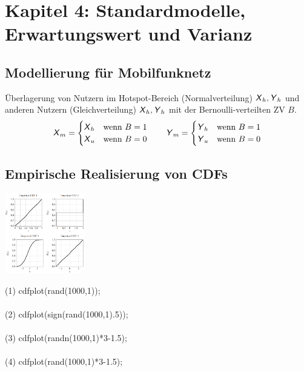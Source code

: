 \documentclass[deutsch]{latex4ei/latex4ei_sheet}
\begin{document}
\section{Kapitel 4: Standardmodelle, Erwartungswert und Varianz}
\begin{sectionbox}
	\subsection{Modellierung für Mobilfunknetz}
	Überlagerung von Nutzern im Hotspot-Bereich (Normalverteilung) $\operatorname{\textsf{\textit{X}}}_h, \operatorname{\textsf{\textit{Y}}}_h$ und anderen Nutzern (Gleichverteilung) $\operatorname{\textsf{\textit{X}}}_h, \operatorname{\textsf{\textit{Y}}}_h$ mit der Bernoulli-verteilten ZV $B$.
	\[\operatorname{\textsf{\textit{X}}}_m=\begin{cases}
	\operatorname{\textsf{\textit{X}}}_h & \text{wenn } B=1\\
	\operatorname{\textsf{\textit{X}}}_u & \text{wenn } B=0\\
	\end{cases} \qquad 
	\operatorname{\textsf{\textit{Y}}}_m=\begin{cases}
	\operatorname{\textsf{\textit{Y}}}_h & \text{wenn } B=1\\
	\operatorname{\textsf{\textit{Y}}}_u & \text{wenn } B=0\\
	\end{cases}
	\]
	
\end{sectionbox}

\begin{sectionbox}
	\subsection{Empirische Realisierung von CDFs}	
	\parbox{3.5cm}{
		\includegraphics[width = 3.5cm]{img/cdf-sample.png}
	}
	\parbox{3.5cm}{
		(1)	cdfplot(rand(1000,1)); \\\\
		(2)	cdfplot(sign(rand(1000,1).5)); \\\\
		(3)	cdfplot(randn(1000,1)*3-1.5); \\\\
		(4)	cdfplot(rand(1000,1)*3-1.5);
		}
\end{sectionbox}
\end{document}
